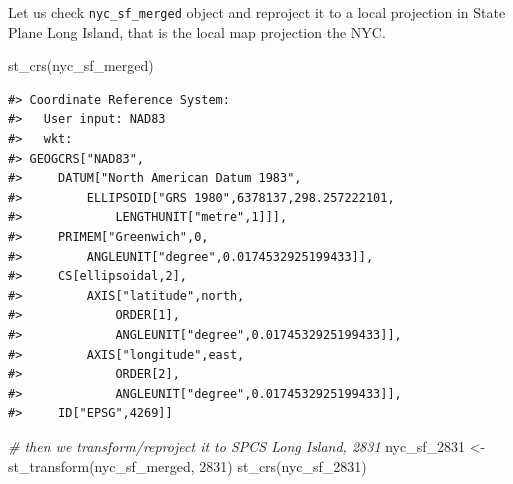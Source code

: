 \documentclass[
  11pt,
]{book}
\newenvironment{Shaded}{\begin{snugshade}}{\end{snugshade}}
\newcommand{\CommentTok}[1]{\textcolor[rgb]{0.56,0.35,0.01}{\textit{#1}}}
\newcommand{\DecValTok}[1]{\textcolor[rgb]{0.00,0.00,0.81}{#1}}
\newcommand{\FunctionTok}[1]{\textcolor[rgb]{0.00,0.00,0.00}{#1}}
\newcommand{\NormalTok}[1]{#1}
\newcommand{\OtherTok}[1]{\textcolor[rgb]{0.56,0.35,0.01}{#1}}
\begin{document}
Let us check \texttt{nyc\_sf\_merged} object and reproject it to a local projection in State Plane Long Island, that is the local map projection the NYC.

\begin{Shaded}
\begin{Highlighting}[]
\FunctionTok{st\_crs}\NormalTok{(nyc\_sf\_merged)}
\end{Highlighting}
\end{Shaded}

\begin{verbatim}
#> Coordinate Reference System:
#>   User input: NAD83 
#>   wkt:
#> GEOGCRS["NAD83",
#>     DATUM["North American Datum 1983",
#>         ELLIPSOID["GRS 1980",6378137,298.257222101,
#>             LENGTHUNIT["metre",1]]],
#>     PRIMEM["Greenwich",0,
#>         ANGLEUNIT["degree",0.0174532925199433]],
#>     CS[ellipsoidal,2],
#>         AXIS["latitude",north,
#>             ORDER[1],
#>             ANGLEUNIT["degree",0.0174532925199433]],
#>         AXIS["longitude",east,
#>             ORDER[2],
#>             ANGLEUNIT["degree",0.0174532925199433]],
#>     ID["EPSG",4269]]
\end{verbatim}

\begin{Shaded}
\begin{Highlighting}[]
\CommentTok{\# then we transform/reproject it to SPCS Long Island, 2831}
\NormalTok{nyc\_sf\_2831 }\OtherTok{\textless{}{-}} \FunctionTok{st\_transform}\NormalTok{(nyc\_sf\_merged, }\DecValTok{2831}\NormalTok{)}
\FunctionTok{st\_crs}\NormalTok{(nyc\_sf\_2831)}
\end{Highlighting}
\end{Shaded}
\end{document}
